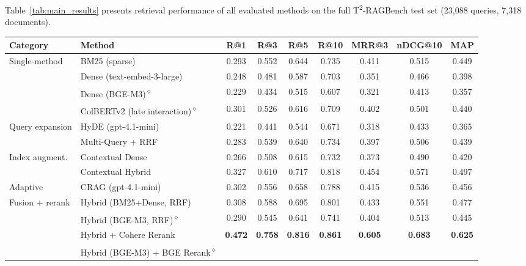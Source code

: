 \documentclass{article}
\begin{document}
Table~\ref{tab:main_results} presents retrieval performance of all evaluated methods on the full T\textsuperscript{2}-RAGBench test set (23,088 queries, 7,318 documents).

\begin{table}[t]
\centering
\footnotesize
\setlength{\tabcolsep}{3pt}
\begin{tabular}{llccccccc}
\toprule
\textbf{Category} & \textbf{Method} & \textbf{R@1} & \textbf{R@3} & \textbf{R@5} & \textbf{R@10} & \textbf{MRR@3} & \textbf{nDCG@10} & \textbf{MAP} \\
\midrule
\multirow{4}{*}{Single-method}
  & BM25 (sparse)               & 0.293 & 0.552 & 0.644 & 0.735 & 0.411 & 0.515 & 0.449 \\
  & Dense (text-embed-3-large)  & 0.248 & 0.481 & 0.587 & 0.703 & 0.351 & 0.466 & 0.398 \\
  & Dense (BGE-M3)\textsuperscript{$\diamond$}
                                & 0.229 & 0.434 & 0.515 & 0.607 & 0.321 & 0.413 & 0.357 \\
  & ColBERTv2 (late interaction)\textsuperscript{$\diamond$}
                                & 0.301 & 0.526 & 0.616 & 0.709 & 0.402 & 0.501 & 0.440 \\
\midrule
\multirow{2}{*}{Query expansion}
  & HyDE (gpt-4.1-mini)        & 0.221 & 0.441 & 0.544 & 0.671 & 0.318 & 0.433 & 0.365 \\
  & Multi-Query + RRF           & 0.283 & 0.539 & 0.640 & 0.734 & 0.397 & 0.506 & 0.439 \\
\midrule
\multirow{2}{*}{Index augment.}
  & Contextual Dense            & 0.266 & 0.508 & 0.615 & 0.732 & 0.373 & 0.490 & 0.420 \\
  & Contextual Hybrid           & 0.327 & 0.610 & 0.717 & 0.818 & 0.454 & 0.571 & 0.497 \\
\midrule
Adaptive & CRAG (gpt-4.1-mini)    & 0.302 & 0.556 & 0.658 & 0.788 & 0.415 & 0.536 & 0.456 \\
\midrule
\multirow{4}{*}{Fusion + rerank}
  & Hybrid (BM25+Dense, RRF)    & 0.308 & 0.588 & 0.695 & 0.801 & 0.433 & 0.551 & 0.477 \\
  & Hybrid (BGE-M3, RRF)\textsuperscript{$\diamond$}
                                & 0.290 & 0.545 & 0.641 & 0.741 & 0.404 & 0.513 & 0.445 \\
  & Hybrid + Cohere Rerank      & \textbf{0.472} & \textbf{0.758} & \textbf{0.816} & \textbf{0.861} & \textbf{0.605} & \textbf{0.683} & \textbf{0.625} \\
  & Hybrid (BGE-M3) + BGE Rerank\textsuperscript{$\diamond$}

\end{tabular}
\end{table}
\end{document}
